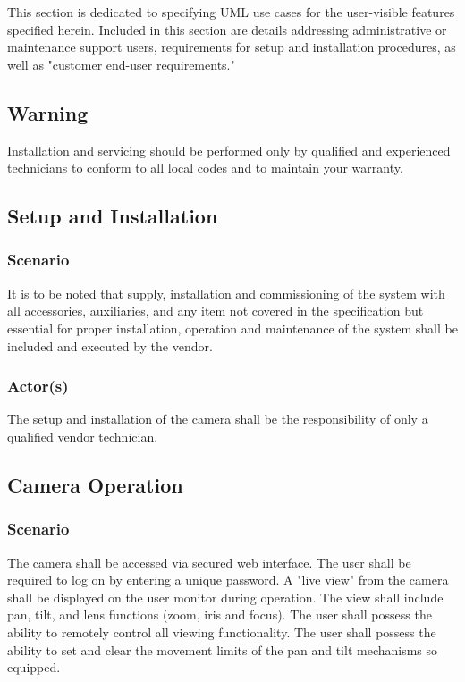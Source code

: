 This section is dedicated to specifying UML use cases for the user-visible features specified herein. Included in this section are details addressing administrative or maintenance support users, requirements for setup and installation procedures, as well as "customer end-user requirements."

\subsection{Warning}
Installation and servicing should be performed only by qualified and experienced technicians to conform to all local codes and to maintain your warranty.

\subsection{Setup and Installation}

\subsubsection{Scenario}
It is to be noted that supply, installation and commissioning of the system with all accessories, auxiliaries, and any item not covered in the specification but essential for proper installation, operation and maintenance of the system shall be included and executed by the vendor.

\subsubsection{Actor(s)}
The setup and installation of the camera shall be the responsibility of only a qualified vendor technician.

\subsection{Camera Operation}

\subsubsection{Scenario}
The camera shall be accessed via secured web interface.
The user shall be required to log on by entering a unique password.
A "live view" from the camera shall be displayed on the user monitor during operation. 
The view shall include pan, tilt, and lens functions (zoom, iris and focus). 
The user shall possess the ability to remotely control all viewing functionality.
The user shall possess the ability to set and clear the movement limits of the pan and tilt mechanisms so equipped.

